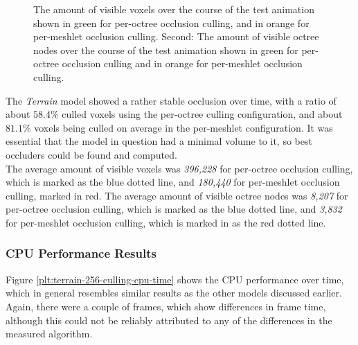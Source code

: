 \begin{figure}[!htb]
\begin{center}
      \caption{The amount of visible voxels over the course of the test animation shown in green for per-octree 
      occlusion culling, and in orange for per-meshlet occlusion culling.  Second: The amount of visible octree 
      nodes over the course of the test animation shown in green for per-octree occlusion culling and in orange 
      for per-meshlet occlusion culling.}
      \label{plt:terrain-256-culling-res-voxels}
    \end{center}
  \end{figure}


\noindent
The \emph{Terrain} model showed a rather stable occlusion over time, with a ratio of about $58.4\%$ culled voxels 
using the per-octree culling configuration, and about $81.1\%$ voxels being culled on average in the per-meshlet 
configuration. It was essential that the model in question had a minimal volume to it, so best occluders could be 
found and computed. \\

\noindent
The average amount of visible voxels was \emph{396,228} for per-octree occlusion culling, which is marked as the 
blue dotted line, and \emph{180,440} for per-meshlet occlusion culling, marked in red. The average amount of 
visible octree nodes was \emph{8,207} for per-octree occlusion culling, which is marked as the blue dotted line, 
and \emph{3,832} for per-meshlet occlusion culling, which is marked in as the red dotted line.

\subsubsection*{CPU Performance Results} \label{subsubsec-cpu-performance-results-terrain}

Figure \ref{plt:terrain-256-culling-cpu-time} shows the \ac{CPU} performance over time, which in general 
resembles similar results as the other models discussed earlier. Again, there were a couple of frames, 
which show differences in frame time, although this could not be reliably attributed to any of the differences 
in the measured algorithm. 

